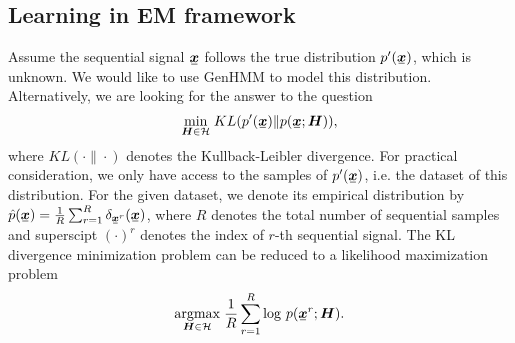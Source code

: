 \subsection{Learning in EM framework}

Assume the sequential signal $\ubm{x}$ follows the true distribution $p^{\prime}(\ubm{x})$, which is unknown. We would like to use GenHMM to model this distribution. Alternatively, we are looking for the answer to the question
\begin{equation}
  \umin{\bm{H}\in \Hh} KL({p^{\prime}}(\ubm{x})\| p(\ubm{x};\bm{H})),
\end{equation}
where $KL(\cdot\|\cdot)$ denotes the Kullback-Leibler divergence. For practical consideration, we only have access to the samples of $p^{\prime}(\ubm{x})$, i.e. the dataset of this distribution. For the given dataset, we denote its empirical distribution by $\hat{p}(\ubm{x}) = \frac{1}{R}\sum_{r=1}^{R} \delta_{\ubmr{x}{r}}(\ubm{x})$, where $R$ denotes the total number of sequential samples and superscipt $(\cdot)^{r}$ denotes the index of $r$-th sequential signal. 
The KL divergence minimization problem can be reduced to a likelihood maximization problem
\begin{equation}\label{eq:ml-of-hmm}
  \uargmax{\bm{H} \in \Hh} \frac{1}{R}\sum_{r=1}^{R}\log\,p(\ubmr{x}{r}; \bm{H}).
\end{equation}

